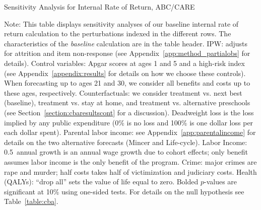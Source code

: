 \begin{table}
\begin{threeparttable}
\caption{Sensitivity Analysis for Internal Rate of Return, ABC/CARE}
\label{table:irrsens}
\centering
\scriptsize

\begin{tablenotes}
\scriptsize
\item Note: This table displays sensitivity analyses of our baseline internal rate of return calculation to the perturbations indexed in the different rows. The characteristics of the \textit{baseline} calculation are in the table header. IPW: adjusts for attrition and item non-response (see  Appendix~\ref{app:method_partialobs} for details). Control variables: Apgar scores at ages 1 and 5 and a high-risk index (see  Appendix~\ref{appendix:results} for details on how we choose these controls). When forecasting up to ages 21 and 30, we consider all benefits and costs up to these ages, respectively. Counterfactuals: we consider treatment vs. next best (baseline), treatment vs. stay at home, and treatment vs. alternative preschools (see Section~\ref{section:cbaresultscont} for a discussion). Deadweight loss is the loss implied by any public expenditure (0\% is no loss and 100\% is one dollar loss per each dollar spent). Parental labor income: see  Appendix~\ref{app:parentalincome} for details on the two alternative forecasts (Mincer and Life-cycle). Labor Income: 0.5\ annual growth is an annual wage growth due to cohort effects; only benefit assumes labor income is the only benefit of the program. Crime: major crimes are rape and murder; half costs takes half of victimization and judiciary costs. Health (QALYs): ``drop all'' sets the value of life equal to zero. Bolded $p$-values are significant at 10\% using one-sided tests. For details on the null hypothesis see Table~\ref{table:cba}.
\end{tablenotes}
\end{threeparttable}
\end{table}

